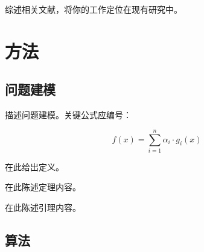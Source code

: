 \documentclass[macnew, cn]{manuscript}
\begin{document}
综述相关文献，将你的工作定位在现有研究中。

\section{方法}
\label{sec:method}

\subsection{问题建模}
\label{subsec:formulation}

描述问题建模。关键公式应编号：

\begin{equation}
    f(x) = \sum_{i=1}^{n} \alpha_i \cdot g_i(x)
    \label{eq:example}
\end{equation}

\begin{definition}[术语名称]
    在此给出定义。
\end{definition}

\begin{theorem}[定理名称]
    在此陈述定理内容。
\end{theorem}

\begin{lemma}[引理名称]
    在此陈述引理内容。
\end{lemma}

\subsection{算法}
\label{subsec:algorithm}
\end{document}
